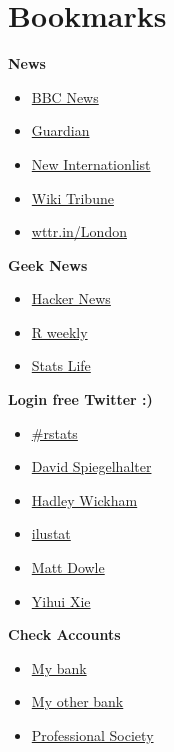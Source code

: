 \documentclass[]{book}
\providecommand{\tightlist}{%
  \setlength{\itemsep}{0pt}\setlength{\parskip}{0pt}}
\theoremstyle{definition}
\theoremstyle{definition}
\theoremstyle{definition}
\theoremstyle{remark}
\begin{document}
\chapter{Bookmarks}\label{bookmarks}

\textbf{News}

\begin{itemize}
\tightlist
\item
  \href{https://www.bbc.com/news}{BBC News}
\item
  \href{https://theguardian.com}{Guardian}
\item
  \href{https://newint.org/}{New Internationlist}
\item
  \href{https://www.wikitribune.com/}{Wiki Tribune}
\item
  \href{http://wttr.in/London}{wttr.in/London}
\end{itemize}

\textbf{Geek News}

\begin{itemize}
\tightlist
\item
  \href{https://news.ycombinator.com/}{Hacker News}
\item
  \href{https://rweekly.org}{R weekly}
\item
  \href{https://www.statslife.org.uk/}{Stats Life}
\end{itemize}

\textbf{Login free Twitter :)}

\begin{itemize}
\tightlist
\item
  \href{https://twitter.com/hashtag/rstats?src=hash}{\#rstats}
\item
  \href{https://twitter.com/d_spiegel}{David Spiegelhalter}
\item
  \href{https://twitter.com/hadleywickham}{Hadley Wickham}
\item
  \href{https://twitter.com/ilustat}{ilustat}
\item
  \href{https://twitter.com/MattDowle}{Matt Dowle}
\item
  \href{https://twitter.com/xieyihui}{Yihui Xie}
\end{itemize}

\textbf{Check Accounts}

\begin{itemize}
\tightlist
\item
  \href{https://www.example.com/}{My bank}
\item
  \href{https://www.example.com/}{My other bank}
\item
  \href{https://www.example.com/}{Professional Society}
\end{itemize}
\end{document}
